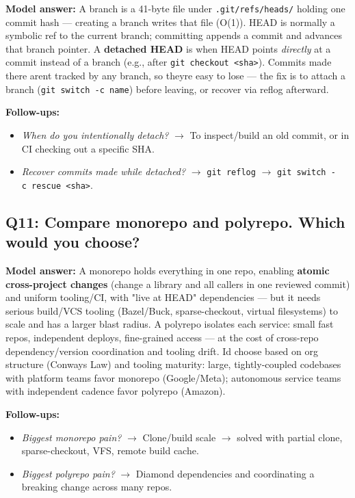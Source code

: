\documentclass[11pt]{article}
\providecommand{\tightlist}{\setlength{\itemsep}{1pt}\setlength{\parskip}{0pt}}
\begin{document}
\textbf{Model answer:} A branch is a 41-byte file under \texttt{.git/refs/heads/} holding one commit hash --- creating a branch writes that file (O(1)). HEAD is normally a symbolic ref to the current branch; committing appends a commit and advances that branch pointer. A \textbf{detached HEAD} is when HEAD points \emph{directly} at a commit instead of a branch (e.g., after \texttt{git\ checkout\ \textless{}sha\textgreater{}}). Commits made there aren\textquotesingle t tracked by any branch, so they\textquotesingle re easy to lose --- the fix is to attach a branch (\texttt{git\ switch\ -c\ name}) before leaving, or recover via reflog afterward.

\textbf{Follow-ups:}

\begin{itemize}
\tightlist
\item
  \emph{When do you intentionally detach?} \(\rightarrow\) To inspect/build an old commit, or in CI checking out a specific SHA.
\item
  \emph{Recover commits made while detached?} \(\rightarrow\) \texttt{git\ reflog} \(\rightarrow\) \texttt{git\ switch\ -c\ rescue\ \textless{}sha\textgreater{}}.
\end{itemize}

\subsection{Q11: Compare monorepo and polyrepo. Which would you choose?}\label{q11-compare-monorepo-and-polyrepo-which-would-you-choose}

\textbf{Model answer:} A monorepo holds everything in one repo, enabling \textbf{atomic cross-project changes} (change a library and all callers in one reviewed commit) and uniform tooling/CI, with "live at HEAD" dependencies --- but it needs serious build/VCS tooling (Bazel/Buck, sparse-checkout, virtual filesystems) to scale and has a larger blast radius. A polyrepo isolates each service: small fast repos, independent deploys, fine-grained access --- at the cost of cross-repo dependency/version coordination and tooling drift. I\textquotesingle d choose based on org structure (Conway\textquotesingle s Law) and tooling maturity: large, tightly-coupled codebases with platform teams favor monorepo (Google/Meta); autonomous service teams with independent cadence favor polyrepo (Amazon).

\textbf{Follow-ups:}

\begin{itemize}
\tightlist
\item
  \emph{Biggest monorepo pain?} \(\rightarrow\) Clone/build scale \(\rightarrow\) solved with partial clone, sparse-checkout, VFS, remote build cache.
\item
  \emph{Biggest polyrepo pain?} \(\rightarrow\) Diamond dependencies and coordinating a breaking change across many repos.
\end{itemize}
\end{document}
